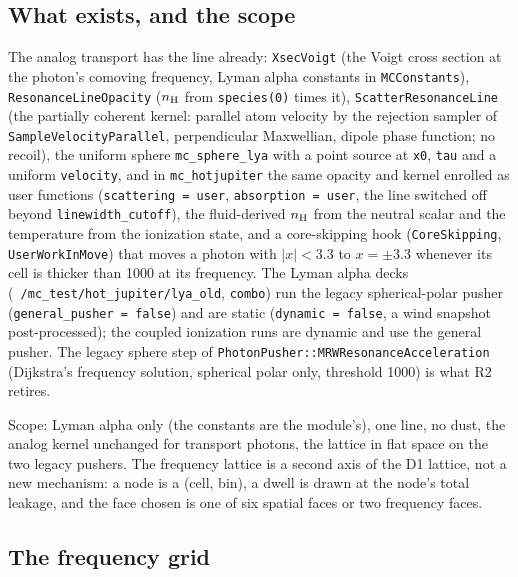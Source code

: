 \documentclass[11pt]{article}
\newcommand{\key}[1]{\texttt{#1}}
\begin{document}
\subsection{What exists, and the scope}

The analog transport has the line already: \texttt{XsecVoigt} (the Voigt cross section
at the photon's comoving frequency, Lyman alpha constants in \texttt{MCConstants}),
\texttt{ResonanceLineOpacity} ($n_{\rm H}$ from \texttt{species(0)} times it),
\texttt{ScatterResonanceLine} (the partially coherent kernel: parallel atom velocity by
the rejection sampler of \texttt{SampleVelocityParallel}, perpendicular Maxwellian,
dipole phase function; no recoil), the uniform sphere \texttt{mc\_sphere\_lya} with a
point source at \key{x0}, \key{tau} and a uniform \key{velocity}, and in
\texttt{mc\_hotjupiter} the same opacity and kernel enrolled as user functions
(\texttt{scattering = user}, \texttt{absorption = user}, the line switched off beyond
\key{linewidth\_cutoff}), the fluid-derived $n_{\rm H}$ from the neutral scalar and the
temperature from the ionization state, and a core-skipping hook
(\texttt{CoreSkipping}, \texttt{UserWorkInMove}) that moves a photon with
$|x| < 3.3$ to $x = \pm3.3$ whenever its cell is thicker than 1000 at its frequency.
The Lyman alpha decks (\texttt{~/mc\_test/hot\_jupiter/lya\_old}, \texttt{combo}) run
the legacy spherical-polar pusher (\texttt{general\_pusher = false}) and are static
(\texttt{dynamic = false}, a wind snapshot post-processed); the coupled ionization runs
are dynamic and use the general pusher.  The legacy sphere step of
\texttt{PhotonPusher::MRWResonanceAcceleration} (Dijkstra's frequency solution,
spherical polar only, threshold 1000) is what R2 retires.

Scope: Lyman alpha only (the constants are the module's), one line, no dust, the
analog kernel unchanged for transport photons, the lattice in flat space on the two
legacy pushers.  The frequency lattice is a second axis of the D1 lattice, not a new
mechanism: a node is a (cell, bin), a dwell is drawn at the node's total leakage, and
the face chosen is one of six spatial faces or two frequency faces.

\subsection{The frequency grid}
\end{document}
